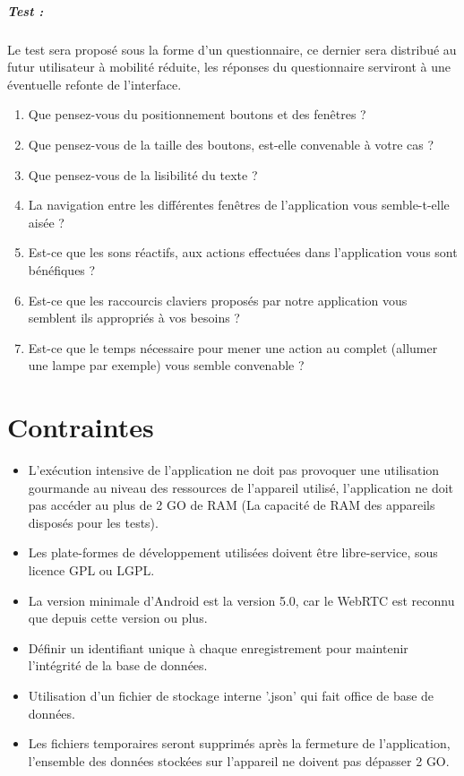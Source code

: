 \documentclass[12pt,a4paper]{article}
\begin{document}
\subparagraph{Test :} Le test sera proposé sous la forme d'un questionnaire, ce dernier sera distribué au futur utilisateur à mobilité réduite, les réponses du questionnaire serviront à une éventuelle refonte de l'interface.\par
\begin{enumerate}
  \item Que pensez-vous du positionnement boutons et des fenêtres ?
  \item Que pensez-vous de la taille des boutons, est-elle convenable à votre cas ? 
  \item Que pensez-vous de la lisibilité du texte ?
  \item La navigation entre les différentes fenêtres de l'application vous semble-t-elle aisée ?
  \item Est-ce que les sons réactifs, aux actions effectuées dans l'application vous sont bénéfiques ?
  \item Est-ce que les raccourcis claviers proposés par notre application vous semblent ils appropriés à vos besoins ?
  \item Est-ce que le temps nécessaire pour mener une action au complet (allumer une lampe par exemple) vous semble convenable ?
\end{enumerate}

\section{Contraintes}

\begin{itemize}
  \item L'exécution intensive de l'application ne doit pas provoquer une utilisation gourmande au niveau des ressources de l'appareil utilisé, l'application ne doit pas accéder au plus de 2 GO de RAM (La capacité de RAM des appareils disposés pour les tests).
  \item Les plate-formes de développement  utilisées doivent être libre-service, sous licence GPL ou LGPL.
  \item La version minimale d'Android est la version 5.0, car le WebRTC est reconnu que depuis cette version ou plus.
  \item Définir un identifiant unique à chaque enregistrement pour maintenir l'intégrité de la base de données.
  \item Utilisation d'un fichier de stockage interne '.json' qui fait office de base de données.
  \item Les fichiers temporaires seront supprimés après la fermeture de l'application, l'ensemble des données stockées sur l'appareil ne doivent pas dépasser 2 GO.
\end{itemize}
\end{document}

